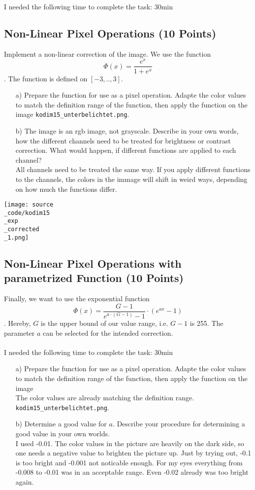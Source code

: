 I needed the following time to complete the task: 30min

\subsection{Non-Linear Pixel Operations (10 Points)}

Implement a non-linear correction of the image. We use the function $$ \Phi(x) = \frac{e^x}{1+e^x}$$. The function is defined on $[-3,..,3]$. 

\begin{enumerate}
\item[a)] Prepare the function for use as a pixel operation. Adapte the color values to match the definition range of the function, then apply the function on the image \texttt{kodim15\_unterbelichtet.png}.
\item[b)] The image is an rgb image, not grayscale. Describe in your own words, how the different channels need to be treated for brightness or contrast correction. What would happen,
if different functions are applied to each channel?\\
All channels need to be treated the same way. If you apply different functions to the channels, the colors in the immage will shift in weird ways, depending on how much the functions differ.
\end{enumerate}

\texttt{[image: source\\\_code/kodim15\\\_exp\\\_corrected\\\_1.png]}

\subsection{Non-Linear Pixel Operations with parametrized Function (10 Points)}

Finally, we want to use the exponential function $$ \Phi(x) = \frac{G-1}{e^{a \cdot (G-1)} - 1} \cdot (e^{ax} - 1)$$. Hereby, $G$ is the upper bound of our value range, i.e. $G-1$ is 255. The
parameter $a$ can be selected for the intended correction.\\
\\
I needed the following time to complete the task: 30min

\begin{enumerate}
\item[a)] Prepare the function for use as a pixel operation. Adapte the color values to match the definition range of the function, then apply the function on the image\\
The color values are already matching the definition range.
\texttt{kodim15\_unterbelichtet.png}.
\item[b)] Determine a good value for $a$. Describe your procedure for determining a good value in your own worlds.\\
I used -0.01. The color values in the picture are heavily on the dark side, so one needs a negative value to brighten the picture up. Just by trying out, -0.1 is too bright and -0.001 not noticable enough. For my eyes everything from -0.008 to -0.01 was in an acceptable range. Even -0.02 already was too bright again.
\end{enumerate}

